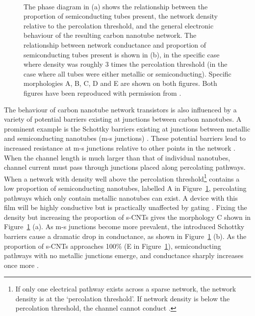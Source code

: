 \documentclass[
  a4paper,
]{scrbook}
\begin{document}
\begin{figure}
\begin{minipage}[t]{0.40\linewidth}
{}

\end{minipage}%
%
\begin{minipage}[t]{0.01\linewidth}

{\centering 

~

}

\end{minipage}%

\caption{\label{fig-m-s-junctions}The phase diagram in (a) shows the
relationship between the proportion of semiconducting tubes present, the
network density relative to the percolation threshold, and the general
electronic behaviour of the resulting carbon nanotube network. The
relationship between network conductance and proportion of
semiconducting tubes present is shown in (b), in the specific case where
density was roughly 3 times the percolation threshold (in the case where
all tubes were either metallic or semiconducting). Specific morphologies
A, B, C, D and E are shown on both figures. Both figures have been
reproduced with permission from \autocite{Topinka2009}.}

\end{figure}

The behaviour of carbon nanotube network transistors is also influenced
by a variety of potential barriers existing at junctions between carbon
nanotubes. A prominent example is the Schottky barriers existing at
junctions between metallic and semiconducting nanotubes (m-s junctions)
\autocite{Fuhrer2000,Topinka2009,Murugathas2019}. These potential
barriers lead to increased resistance at m-s junctions relative to other
points in the network \autocite{Fuhrer2000,Jang2015}. When the channel
length is much larger than that of individual nanotubes, channel current
must pass through junctions placed along percolating pathways. When a
network with density well above the percolation threshold\footnote{If
  only one electrical pathway exists across a sparse network, the
  network density is at the `percolation threshold'. If network density
  is below the percolation threshold, the channel cannot conduct
  \autocite{Hu2004,Topinka2009,Jang2015}.} contains a low proportion of
semiconducting nanotubes, labelled A in Figure~\ref{fig-m-s-junctions},
percolating pathways which only contain metallic nanotubes can exist. A
device with this film will be highly conductive but is practically
unaffected by gating \autocite{Fuhrer2000,Topinka2009}. Fixing the
density but increasing the proportion of s-CNTs gives the morphology C
shown in Figure~\ref{fig-m-s-junctions} (a). As m-s junctions become
more prevalent, the introduced Schottky barriers cause a dramatic drop
in conductance, as shown in Figure~\ref{fig-m-s-junctions} (b). As the
proportion of s-CNTs approaches 100\% (E in
Figure~\ref{fig-m-s-junctions}), semiconducting pathways with no
metallic junctions emerge, and conductance sharply increases once more
\autocite{Topinka2009}.
\end{document}
